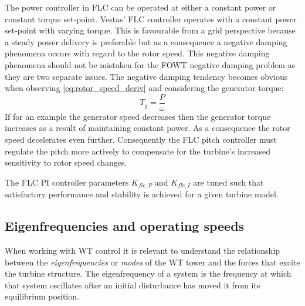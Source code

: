 The power controller in FLC can be operated at either a constant power or constant torque set-point. Vestas' FLC controller operates with a constant power set-point with varying torque. This is favourable from a grid perspective because a steady power delivery is preferable but as a consequence a negative damping phenomena occurs with regard to the rotor speed. This negative damping phenomena should not be mistaken for the FOWT negative damping problem as they are two separate issues. The negative damping tendency becomes obvious when observing \cref{eq:rotor_speed_deriv} and considering the generator torque:
\begin{equation}\label{eq:gen_torque}
	T_g = \dfrac{P}{\omega}
\end{equation}
If for an example the generator speed decreases then the generator torque increases as a result of maintaining constant power. As a consequence the rotor speed decelerates even further. Consequently the FLC pitch controller must regulate the pitch more actively to compensate for the turbine's increased sensitivity to rotor speed changes.

The FLC PI controller parameters $ K_{flc,P} $ and $ K_{flc,I} $ are tuned such that satisfactory performance and stability is achieved for a given turbine model. 


\subsection{Eigenfrequencies and operating speeds} \label{sec:theory_eigenfreq}
When working with WT control it is relevant to understand the relationship between the \textit{eigenfrequencies} or \textit{modes} of the WT tower and the forces that excite the turbine structure. The eigenfrequency of a system is the frequency at which that system oscillates after an initial disturbance has moved it from its equilibrium position.

